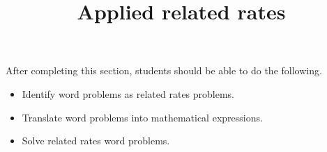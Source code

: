 \documentclass{ximera}
\title{Applied related rates}
\begin{document}
\begin{abstract}
\end{abstract}

\maketitle

\begin{sectionOutcomes}

After completing this section, students should be able to do the following.

\begin{itemize}
	\item Identify word problems as related rates problems.
	\item Translate word problems into mathematical expressions.
	\item Solve related rates word problems.
\end{itemize}

\end{sectionOutcomes}
\end{document}
